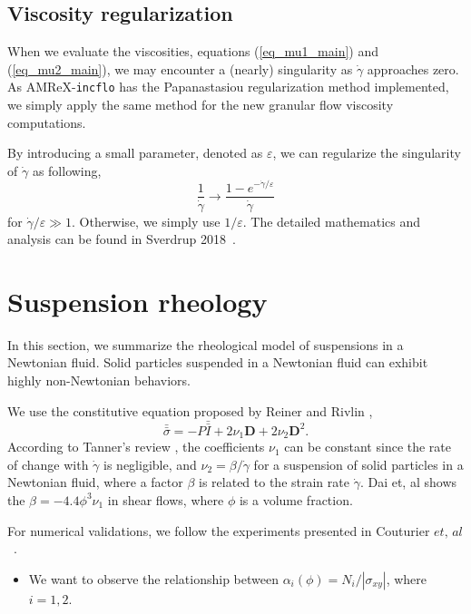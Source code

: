 \subsection{Viscosity regularization}
When we evaluate the viscosities, equations (\ref{eq_mu1_main}) and (\ref{eq_mu2_main}), we may encounter a (nearly) singularity as $\dot{\gamma}$ approaches zero.
As AMReX-\verb+incflo+ has the Papanastasiou regularization method implemented, we simply apply the same method for the new granular flow viscosity computations.
\par
By introducing a small parameter, denoted as $\varepsilon$, we can regularize the singularity of $\dot{\gamma}$ as following,
\[
  \frac{1}{\dot{\gamma}} \rightarrow \frac{1-e^{-\dot{\gamma} / \varepsilon}}{\dot{\gamma}}  
\]
for $\dot{\gamma}/\varepsilon \gg 1$. Otherwise, we simply use $1/\varepsilon$. 
The detailed mathematics and analysis can be found in Sverdrup 2018~\cite{sverdrup_highly_2018}.
\section{Suspension rheology}
In this section, we summarize the rheological model of suspensions in a Newtonian fluid. Solid particles suspended in a Newtonian fluid can exhibit highly non-Newtonian behaviors.  
\par
We use the constitutive equation proposed by Reiner \cite{reiner_mathematical_1945} and Rivlin \cite{rivlin_stress-deformation_1955},  
\begin{equation}
  \bar{\bar{\sigma}} = -P \bar{\bar{I}}
  + 2 \nu_1 {\bm{D}} + 2 \nu_2 {\bm{D}}^2.
\end{equation}
According to Tanner's review \cite{tanner_review_2018}, the coefficients $\nu_1$ can be constant since the rate of change with $\dot{\gamma}$ is negligible, and $\nu_2 = \beta / \dot{\gamma}$ for a suspension of solid particles in a Newtonian fluid, where a factor $\beta$ is related to the strain rate $\dot{\gamma}$. Dai et, al \cite{dai_viscometric_2013} shows the $\beta = -4.4 \phi^3 \nu_1$ in shear flows, where $\phi$ is a volume fraction. 
\par
For numerical validations, we follow the experiments presented in Couturier $\textit{et, al}$~\cite{couturier_suspensions_2011}.
\begin{itemize}
  \item We want to observe the relationship between $\alpha_i(\phi) = N_i / |\sigma_{xy}|$, where $i = 1,2$.
\end{itemize}

